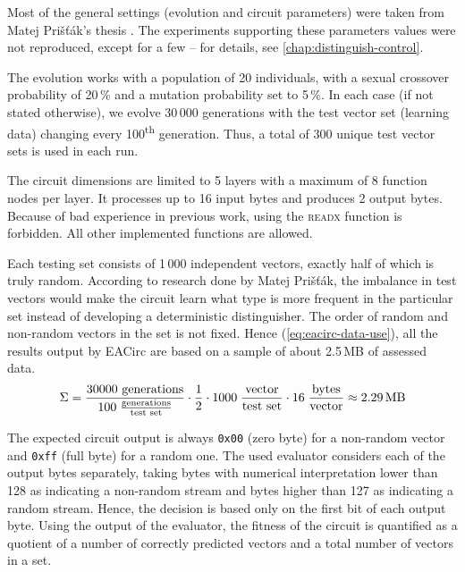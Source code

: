 \documentclass[12pt,oneside]{fithesis2}
\begin{document}
Most of the general settings (evolution and circuit parameters) were taken from Matej Prišťák's thesis \parencite{thesis-pristak}. 
The experiments supporting these parameters values were not reproduced, except for a few -- for details,
see \autoref{chap:distinguish-control}.

The evolution works with a population of 20 individuals, with a sexual crossover probability of 20\,\% and a mutation probability
set to 5\,\%. In each case (if not stated otherwise), we evolve 30\,000 generations with the test vector set
(learning data) changing every 100\textsuperscript{th} generation. Thus, a total of 300 unique test vector sets is used in each run.

The circuit dimensions are limited to 5 layers with a maximum of 8 function nodes per layer. It processes up to 16 input bytes
and produces 2 output bytes. Because of bad experience in previous work, using the \textsc{readx} function is forbidden.
All other implemented functions are allowed.

Each testing set consists of 1\,000 independent vectors, exactly half of which is truly random. 
According to research done by Matej Prišťák, the imbalance in test vectors would make the circuit learn what type is more frequent
in the particular set instead of developing a deterministic distinguisher. 
The order of random and non-random vectors in the set is not fixed.
Hence (\autoref{eq:eacirc-data-use}), all the results output by EACirc are based on a sample of about 2.5\,MB of assessed data.
\begin{equation}
\label{eq:eacirc-data-use}
\Sigma = \frac{30000 \text{ generations}}{100 \; \frac{\text{generations}}{\text{test set}}}
         \cdot \frac{1}{2} \cdot 1000 \; \frac{\text{vector}}{\text{test set}}
         \cdot 16 \; \frac{\text{bytes}}{\text{vector}}
         \approx 2.29 \text{\,MB}
\end{equation}

The expected circuit output is always \texttt{0x00} (zero byte) for a non-random vector and \texttt{0xff} (full byte) 
for a random one.
The used evaluator considers each of the output bytes separately, taking bytes with numerical interpretation lower than
128 as indicating a non-random stream and bytes higher than 127 as indicating a random stream.
Hence, the decision is based only on the first bit of each output byte.
Using the output of the evaluator, the fitness of the circuit is quantified as a quotient of a number of 
correctly predicted vectors and a total number of vectors in a set.
\end{document}
